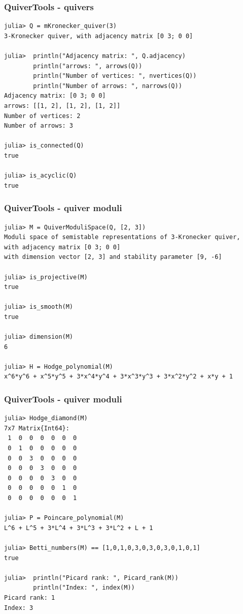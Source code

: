 \documentclass{beamer}
\begin{document}
\begin{frame}[fragile]
    \frametitle{QuiverTools - quivers}
\scriptsize{
\begin{lstlisting}
julia> Q = mKronecker_quiver(3)
3-Kronecker quiver, with adjacency matrix [0 3; 0 0]

julia>  println("Adjacency matrix: ", Q.adjacency)
        println("arrows: ", arrows(Q))
        println("Number of vertices: ", nvertices(Q))
        println("Number of arrows: ", narrows(Q))
Adjacency matrix: [0 3; 0 0]
arrows: [[1, 2], [1, 2], [1, 2]]
Number of vertices: 2
Number of arrows: 3

julia> is_connected(Q)
true

julia> is_acyclic(Q)
true
\end{lstlisting}
}


\end{frame}
\begin{frame}[fragile]
    \frametitle{QuiverTools - quiver moduli}
\scriptsize{
\begin{lstlisting}
julia> M = QuiverModuliSpace(Q, [2, 3])
Moduli space of semistable representations of 3-Kronecker quiver,
with adjacency matrix [0 3; 0 0]
with dimension vector [2, 3] and stability parameter [9, -6]

julia> is_projective(M)
true

julia> is_smooth(M)
true

julia> dimension(M)
6

julia> H = Hodge_polynomial(M)
x^6*y^6 + x^5*y^5 + 3*x^4*y^4 + 3*x^3*y^3 + 3*x^2*y^2 + x*y + 1
\end{lstlisting}
}
\end{frame}
\begin{frame}[fragile]
    \frametitle{QuiverTools - quiver moduli}
\scriptsize{
\begin{lstlisting}
julia> Hodge_diamond(M)
7x7 Matrix{Int64}:
 1  0  0  0  0  0  0
 0  1  0  0  0  0  0
 0  0  3  0  0  0  0
 0  0  0  3  0  0  0
 0  0  0  0  3  0  0
 0  0  0  0  0  1  0
 0  0  0  0  0  0  1

julia> P = Poincare_polynomial(M)
L^6 + L^5 + 3*L^4 + 3*L^3 + 3*L^2 + L + 1

julia> Betti_numbers(M) == [1,0,1,0,3,0,3,0,3,0,1,0,1]
true

julia>  println("Picard rank: ", Picard_rank(M))
        println("Index: ", index(M))
Picard rank: 1
Index: 3
\end{lstlisting}
}
\end{frame}
\end{document}
